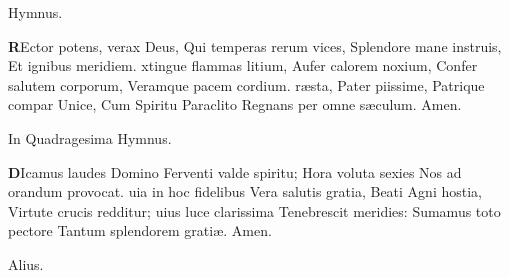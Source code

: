 \documentclass[letter,11pt]{book}
\begin{document}
\begin{multicols*}{2}
\vspace{-.5em} \begin{center} \color{Red} Hymnus. \end{center} \vspace{-.5em}
\lettrine[lines=2]{\bfseries \color{Red} R}{}Ector potens, verax Deus,
\newline Qui temperas rerum vices,
\newline \indent Splendore mane instruis,
\newline \indent Et ignibus meridiem.
xtingue flammas litium,
\newline \indent Aufer calorem noxium,
\newline \indent Confer salutem corporum,
\newline \indent Veramque pacem cordium.
r\ae sta, Pater piissime,
\newline \indent Patrique compar Unice,
\newline \indent Cum Spiritu Paraclito
\newline \indent Regnans per omne s\ae culum. Amen.
\vspace{-.5em} \begin{center} \color{Red} In Quadragesima Hymnus. \end{center} \vspace{-.5em}
\lettrine[lines=2]{\bfseries \color{Red} D}{}Icamus laudes Domino
\newline Ferventi valde spiritu;
\newline \indent Hora voluta sexies
\newline \indent Nos ad orandum provocat.
uia in hoc fidelibus
\newline \indent Vera salutis gratia,
\newline \indent Beati Agni hostia,
\newline \indent Virtute crucis redditur;
uius luce clarissima
\newline \indent Tenebrescit meridies:
\newline \indent Sumamus toto pectore
\newline \indent Tantum splendorem grati\ae . Amen.
\vspace{-.5em} \begin{center} \color{Red} Alius. \end{center} \vspace{-.5em}

\end{multicols*}
\end{document}
